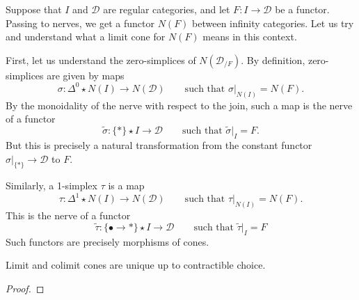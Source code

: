 \documentclass[main.tex]{subfiles}
\begin{document}
Suppose that $I$ and $\mathcal{D}$ are regular categories, and let $F\colon I \to \mathcal{D}$ be a functor. Passing to nerves, we get a functor $N(F)$ between infinity categories. Let us try and understand what a limit cone for $N(F)$ means in this context.

First, let us understand the zero-simplices of $N(\mathcal{D}_{/F})$. By definition, zero-simplices are given by maps
\begin{equation*}
  \sigma\colon \Delta^{0} \star N(I) \to N(\mathcal{D}) \qquad\text{such that } \sigma|_{N(I)} = N(F).
\end{equation*}
By the monoidality of the nerve with respect to the join, such a map is the nerve of a functor
\begin{equation*}
  \tilde{\sigma}\colon \{*\} \star I \to \mathcal{D} \qquad\text{such that } \tilde{\sigma}|_{I} = F.
\end{equation*}
But this is precisely a natural transformation from the constant functor $\sigma|_{\{*\}} \to \mathcal{D}$ to $F$.

Similarly, a 1-simplex $\tau$ is a map
\begin{equation*}
  \tau\colon \Delta^{1} \star N(I) \to N(\mathcal{D})\qquad\text{such that }\tau|_{N(I)} = N(F).
\end{equation*}
This is the nerve of a functor
\begin{equation*}
  \tilde{\tau}\colon \{\bullet \to *\} \star I \to \mathcal{D}\qquad \text{such that } \tilde{\tau}|_{I} = F
\end{equation*}
Such functors are precisely morphisms of cones.

\begin{corollary}
  Limit and colimit cones are unique up to contractible choice.
\end{corollary}
\begin{proof}

\end{proof}
\end{document}
